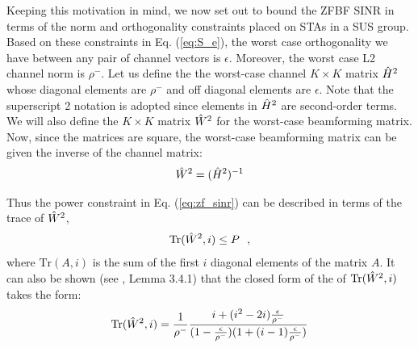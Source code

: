  Keeping this motivation in mind, we now set out to bound the ZFBF SINR in terms of the norm and orthogonality constraints placed on STAs in a SUS group. Based on these constraints in Eq. (\ref{eq:S_e}), the worst case orthogonality we have between any pair of channel vectors is $\epsilon$. Moreover, the worst case L2 channel norm is $\rho^-$. Let us define the the worst-case channel $K \times K$ matrix $\Hat{H}^2$ whose diagonal elements are $\rho^-$ and off diagonal elements are $\epsilon$. Note that the superscript 2 notation is adopted since elements in $\Hat{H}^2$ are second-order terms. We will also define the $K \times K$ matrix $\Hat{W}^2$ for the worst-case beamforming matrix. Now, since the matrices are square, the worst-case beamforming matrix can be given the inverse of the channel matrix:
\begin{equation}\label{eq:zf_bf_worst_case}
     \begin{aligned}
        \Hat{W}^2 = (\Hat{H}^2)^{-1}
     \end{aligned}
 \end{equation}
 
 Thus the power constraint in Eq. (\ref{eq:zf_sinr}) can be described in terms of the trace of  $\Hat{W}^2$,
 \begin{equation}\label{eq:zf_bf_w_worst_case}
     \begin{aligned}
        \text{Tr}(\Hat{W}^2,i) \leq P \ \ ,
     \end{aligned}
 \end{equation}
 where $\text{Tr}(A,i)$ is the sum of the first $i$ diagonal elements of the matrix $A$. It can also be shown (see \cite{SwannackThesis}, Lemma 3.4.1) that the closed form of the of $\text{Tr}(\Hat{W}^2,i)$ takes the form:
  \begin{equation}\label{eq:zf_trace_cf}
     \begin{aligned}
        \text{Tr}(\Hat{W}^2,i)  = \frac{1}{\rho^-}\frac{i+(i^2-2i)\frac{\epsilon}{\rho^-}}{(1-\frac{\epsilon}{\rho^-})(1+(i-1)\frac{\epsilon}{\rho^-})}
     \end{aligned}
 \end{equation}
 
